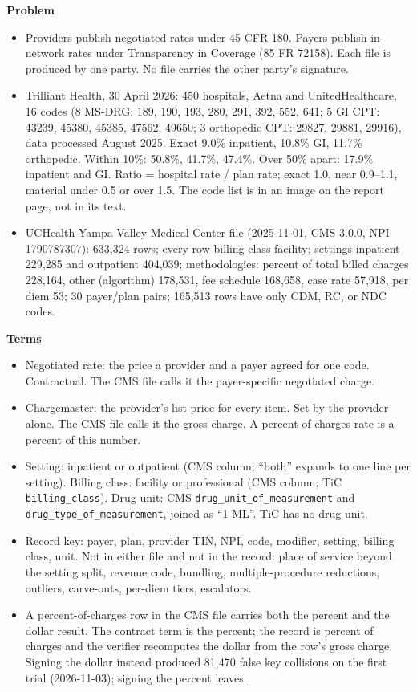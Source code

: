 \textbf{Problem}
\begin{itemize}
\item Providers publish negotiated rates under 45 CFR 180. Payers publish in-network rates under Transparency in Coverage (85 FR 72158). Each file is produced by one party. No file carries the other party's signature.
\item Trilliant Health, 30 April 2026: 450 hospitals, Aetna and UnitedHealthcare, 16 codes (8 MS-DRG: 189, 190, 193, 280, 291, 392, 552, 641; 5 GI CPT: 43239, 45380, 45385, 47562, 49650; 3 orthopedic CPT: 29827, 29881, 29916), data processed August 2025. Exact 9.0\% inpatient, 10.8\% GI, 11.7\% orthopedic. Within 10\%: 50.8\%, 41.7\%, 47.4\%. Over 50\% apart: 17.9\% inpatient and GI. Ratio = hospital rate / plan rate; exact 1.0, near 0.9--1.1, material under 0.5 or over 1.5. The code list is in an image on the report page, not in its text.
\item UCHealth Yampa Valley Medical Center file (2025-11-01, CMS 3.0.0, NPI 1790787307): 633,324 rows; every row billing class facility; settings inpatient 229,285 and outpatient 404,039; methodologies: percent of total billed charges 228,164, other (algorithm) 178,531, fee schedule 168,658, case rate 57,918, per diem 53; 30 payer/plan pairs; 165,513 rows have only CDM, RC, or NDC codes.
\end{itemize}

\textbf{Terms}
\begin{itemize}
\item Negotiated rate: the price a provider and a payer agreed for one code. Contractual. The CMS file calls it the payer-specific negotiated charge.
\item Chargemaster: the provider's list price for every item. Set by the provider alone. The CMS file calls it the gross charge. A percent-of-charges rate is a percent of this number.
\item Setting: inpatient or outpatient (CMS column; ``both'' expands to one line per setting). Billing class: facility or professional (CMS column; TiC \texttt{billing\_class}). Drug unit: CMS \texttt{drug\_unit\_of\_measurement} and \texttt{drug\_type\_of\_measurement}, joined as ``1 ML''. TiC has no drug unit.
\item Record key: payer, plan, provider TIN, NPI, code, modifier, setting, billing class, unit. Not in either file and not in the record: place of service beyond the setting split, revenue code, bundling, multiple-procedure reductions, outliers, carve-outs, per-diem tiers, escalators.
\item A percent-of-charges row in the CMS file carries both the percent and the dollar result. The contract term is the percent; the record is percent of charges and the verifier recomputes the dollar from the row's gross charge. Signing the dollar instead produced 81,470 false key collisions on the first trial (2026-11-03); signing the percent leaves \sheetCollisions{}.
\end{itemize}

